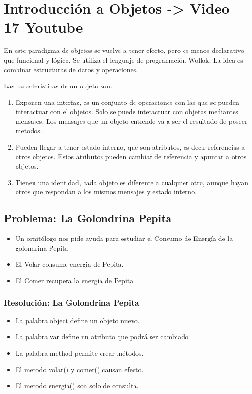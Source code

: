 \documentclass[11pt,a4paper]{article}
\begin{document}
\pagestyle{fancy}
\lhead{\sc }
\chead{}
\rhead{\rightmark}
\lfoot{}
\cfoot{}
\rfoot{\thepage}

%




\newpage

\section{Introducción a Objetos -> Video 17 Youtube}
En este paradigma de objetos se vuelve a tener efecto, pero es menos declarativo que funcional y lógico. Se utiliza el lenguaje de programación Wollok. La idea es combinar estructuras de datos y operaciones.

Las caracteristicas de un objeto son:

\begin{enumerate}
	\item Exponen una interfaz, es un conjunto de operaciones con las que se pueden interactuar con el objetos. Solo se puede interactuar con objetos mediantes mensajes. Los mensajes que un objeto entiende va a ser el resultado de poseer metodos.
	\item Pueden llegar a tener estado interno, que son atributos, es decir referencias a otros objetos. Estos atributos pueden cambiar de referencia y apuntar a otros objetos.
	\item Tienen una identidad, cada objeto es diferente a cualquier otro, aunque hayan otros que respondan a los mismos mensajes y estado interno.
\end{enumerate}

\subsection{Problema: La Golondrina Pepita}

\begin{itemize}
	\item Un ornitólogo nos pide ayuda para estudiar el Consumo de Energía de la golondrina Pepita
	\item El Volar consume energia de Pepita.
	\item El Comer recupera la energía de Pepita.
\end{itemize}

\subsubsection{Resolución: La Golondrina Pepita}
\begin{itemize}
	\item La palabra object define un objeto nuevo.
	\item La palabra var define un atributo que podrá ser cambiado
	\item La palabra method permite crear métodos.
	\item El metodo volar() y comer() causan efecto.
	\item El metodo energia() son solo de consulta.
\end{itemize}
\end{document}
